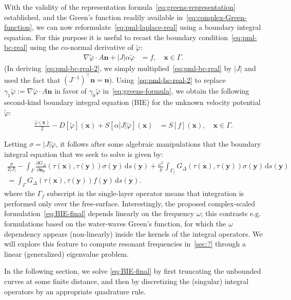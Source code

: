 \documentclass[11pt]{article}
\newcommand{\bn}{\mathbf{n}}
\newcommand{\bx}{\mathbf{x}}
\newcommand{\by}{\mathbf{y}}
\newcommand{\de}{\,\mathrm{d}}
\newcommand{\tvarphi}{\tilde \varphi}
\begin{document}
With the validity of the representation formula~\cref{eq:greens-representation}
established, and the Green's function readily available
in~\cref{eq:complex-Green-function}, we can now
reformulate~\cref{eq:pml-laplace-real} using a boundary integral equation. For
this purpose it is useful to recast the boundary condition~\cref{eq:pml-bc-real}
using the co-normal derivative of $\tvarphi$:
\begin{align}
  \label{eq:pml-bc-real-2}
  \nabla \tvarphi \cdot A\bn + |J| \alpha \tvarphi &= f, \quad \bx \in \Gamma.
\end{align}
(In deriving~\cref{eq:pml-bc-real-2}, we simply multiplied~\cref{eq:pml-bc-real}
by $|J|$ and used the fact that $(J^{-1})^\top \bn =
\bn$). Using~\cref{eq:pml-bc-real-2} to replace $\gamma_1\tvarphi := \nabla
\tvarphi \cdot A \bn$ in favor of $\gamma_0 \tvarphi$
in~\cref{eq:greens-formula}, we obtain the following second-kind boundary
integral equation (BIE) for the unknown velocity potential $\tvarphi$:
\begin{align}
  \label{eq:BIE}
  \frac{\tvarphi(\bx)}{2} - D[\tvarphi](\bx) + S\left[\alpha\left|J\right|\tvarphi\right](\bx) &= S[f](\bx), \quad \bx \in \Gamma.
\end{align}

Letting $\sigma = |J|\tvarphi$, it follows after some algebraic manipulations
that the boundary integral equation that we seek to solve is given by:
\begin{align}
  \label{eq:BIE-final}  
  \frac{\sigma}{2|J|} - \int_\Gamma \frac{\partial G_{\Delta}}{\partial \bn_\by}(\tau(\bx),\tau(\by)) \sigma(\by) \de s(\by) + \frac{\omega^2}{g}\int_{\Gamma_f} G_{\Delta}(\tau(\bx),\tau(\by)) \sigma(\by) \de s(\by) \\
  = \int_{\Gamma} G_{\Delta}(\tau(\bx),\tau(\by)) f(\by) \de s(\by). \nonumber
\end{align}
where the $\Gamma_f$ subscript in the single-layer operator means that
integration is performed only over the free-surface. Interestingly, the proposed
complex-scaled formulation~\cref{eq:BIE-final} depends linearly on the frequency
$\omega$; this contrasts e.g. formulations based on the water-waves Green's
function, for which the $\omega$ dependency appears (non-linearly) inside the
kernels of the integral operators. We will explore this feature to compute
resonant frequencies in~\cref{sec:?} through a linear (generalized) eigenvalue
problem.

In the following section, we solve \cref{eq:BIE-final} by first truncating the
unbounded curves at some finite distance, and then by discretizing the
(singular) integral operators by an appropriate quadrature rule. 
\end{document}
